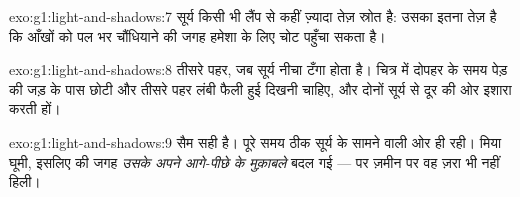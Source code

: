 \begin{solution}{exo:g1:light-and-shadows:7}
सूर्य किसी भी लैंप से कहीं ज़्यादा तेज़ स्रोत है: उसका  इतना
तेज़ है कि आँखों को पल भर चौंधियाने की जगह हमेशा के लिए चोट पहुँचा
सकता है।
\end{solution}

\begin{solution}{exo:g1:light-and-shadows:8}
तीसरे पहर, जब सूर्य नीचा टँगा होता है। चित्र में दोपहर के समय पेड़ की
जड़ के पास छोटी  और तीसरे पहर लंबी फैली हुई  दिखनी चाहिए, और
दोनों सूर्य से दूर की ओर इशारा करती हों।
\end{solution}

\begin{solution}{exo:g1:light-and-shadows:9}
सैम सही है।  पूरे समय ठीक सूर्य के सामने वाली ओर ही रही। मिया
घूमी, इसलिए  की जगह \emph{उसके अपने आगे-पीछे के मुक़ाबले} बदल गई
--- पर ज़मीन पर वह ज़रा भी नहीं हिली।
\end{solution}
